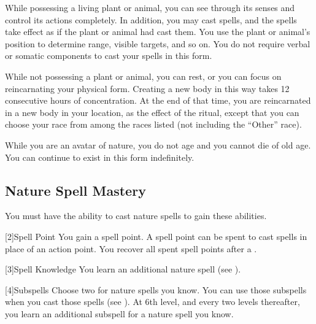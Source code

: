         While possessing a living plant or animal, you can see through its senses and control its actions completely.
        In addition, you may cast spells, and the spells take effect as if the plant or animal had cast them.
        You use the plant or animal's position to determine range, visible targets, and so on.
        You do not require verbal or somatic components to cast your spells in this form.

        While not possessing a plant or animal, you can rest, or you can focus on reincarnating your physical form.
        Creating a new body in this way takes 12 consecutive hours of concentration.
        At the end of that time, you are reincarnated in a new body in your location, as the effect of the  ritual, except that you can choose your race from among the races listed (not including the ``Other'' race).

        While you are an avatar of nature, you do not age and you cannot die of old age.
        You can continue to exist in this form indefinitely.

    \subsection{Nature Spell Mastery}
        You must have the ability to cast nature spells to gain these abilities.

        [2]{Spell Point}
        You gain a spell point.
        A spell point can be spent to cast spells in place of an action point.
        You recover all spent spell points after a .

        [3]{Spell Knowledge} 
        You learn an additional nature spell (see ).

        [4]{Subspells}
        Choose two  for nature spells you know.
        You can use those subspells when you cast those spells (see ).
        At 6th level, and every two levels thereafter, you learn an additional subspell for a nature spell you know.


